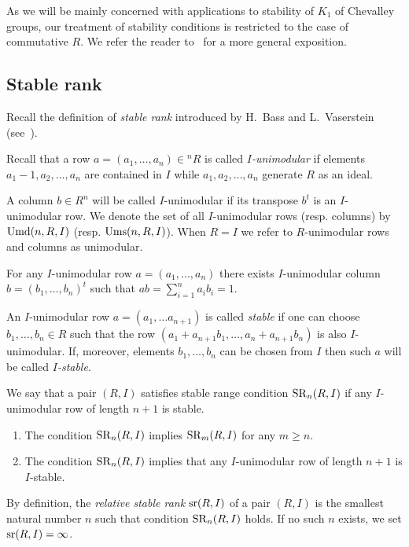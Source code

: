As we will be mainly concerned with applications to stability of $K_1$ of Chevalley groups, our treatment of stability conditions is restricted to the case of commutative $R$. 
We refer the reader to~\cite{Ba64, Va69, Va71} for a more general exposition.

\subsection{Stable rank}
Recall the definition of \emph{stable rank} introduced by H.~Bass and L.~Vaserstein (see~\cite{Ba64, Va69}).
\begin{dfn}
Recall that a row $a=(a_1,\ldots,a_n)\in{}^n\!R$ is called \emph{$I$-unimodular} if elements $a_1-1,a_2,\ldots,a_n$ are contained in $I$ while $a_1,a_2,\ldots,a_n$ generate $R$ as an ideal.
\end{dfn}
A column $b \in R^n$ will be called $I$-unimodular if its transpose $b^t$ is an $I$-unimodular row. We denote the set of all $I$-unimodular rows (resp. columns) by $\operatorname{Umd}(n,R,I)$ (resp. $\operatorname{Ums}(n,R,I)$).
When $R=I$ we refer to $R$-unimodular rows and columns as unimodular.
\begin{lemma}\label{lemma:relstrlemma}
For any $I$-unimodular row $a=(a_1,\ldots,a_n)$ there exists $I$-unimodular column $b=(b_1,\ldots,b_n)^t$ such that $ab=\sum\limits_{i=1}^n a_i b_i=1$.
\end{lemma}
\begin {dfn} An $I$-unimodular row $a=(a_1,\ldots a_{n+1})$ is called \emph{stable} if one can choose $b_1,\ldots,b_n\in R$ such that the row $(a_1+a_{n+1}b_1,\ldots,a_n+a_{n+1}b_n)$ is also $I$-unimodular. If, moreover, elements $b_1,\ldots,b_n$ can be chosen from  $I$ then such $a$ will be called \emph{$I$-stable}. \end{dfn} 
We say that a pair $(R,I)$ satisfies stable range condition $\operatorname{SR}_n(R,I)$ if any $I$-unimodular row of length $n+1$ is stable.
\begin{lemma}\label{lemma:relstrlemma2}\strut
\begin{enumerate}
\item The condition $\operatorname{SR}_n(R,I)$ implies $\operatorname{SR}_m(R,I)$ for any $m\geqslant n$.
\item The condition $\operatorname{SR}_n(R,I)$ implies that any $I$-unimodular row of length $n+1$ is $I$-stable.
\end{enumerate}
\end{lemma}
By definition, the {\it relative stable rank} $\operatorname{sr}(R,I)$ of a pair $(R,I)$ is the smallest natural number $n$ such that condition $\operatorname{SR}_n(R,I)$ holds.
If no such $n$ exists, we set $\operatorname{sr}(R,I)=\infty$.

